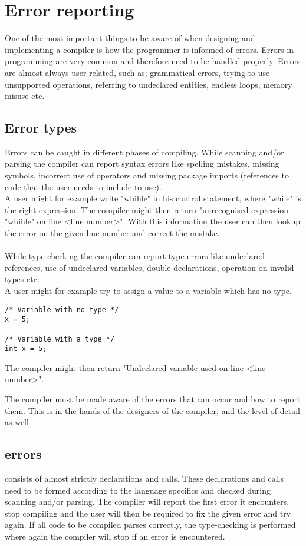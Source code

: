 \section{Error reporting}

One of the most important things to be aware of when designing and implementing a compiler is how the programmer is informed of errors. Errors in programming are very common and therefore need to be handled properly. Errors are almost always user-related, such as; grammatical errors, trying to use unsupported operations, referring to undeclared entities, endless loops, memory misuse etc.

\subsection{Error types}
Errors can be caught in different phases of compiling.
While scanning and/or parsing the compiler can report syntax errors like spelling mistakes, missing symbols, incorrect use of operators and missing package imports (references to code that the user needs to include to use).\\
A user might for example write "whihle" in his control statement, where "while" is the right expression. The compiler might then return "unrecognised expression "whihle" on line <line number>". With this information the user can then lookup the error on the given line number and correct the mistake.\\\\
While type-checking the compiler can report type errors like undeclared references, use of undeclared variables, double declarations, operation on invalid types etc.\\
A user might for example try to assign a value to a variable which has no type.
{\begin{lstlisting}[numbers=none]
/* Variable with no type */
x = 5;

/* Variable with a type */
int x = 5;
\end{lstlisting}}
The compiler might then return "Undeclared variable used on line <line number>".

The compiler must be made aware of the errors that can occur and how to report them. This is in the hands of the designers of the compiler, and the level of detail as well

\subsection{\langname{} errors}

\langname{} consists of almost strictly declarations and calls. These declarations and calls need to be formed according to the language specifics and checked during scanning and/or parsing.
The compiler will report the first error it encounters, stop compiling and the user will then be required to fix the given error and try again.
If all code to be compiled parses correctly, the type-checking is performed where again the compiler will stop if an error is encountered.

